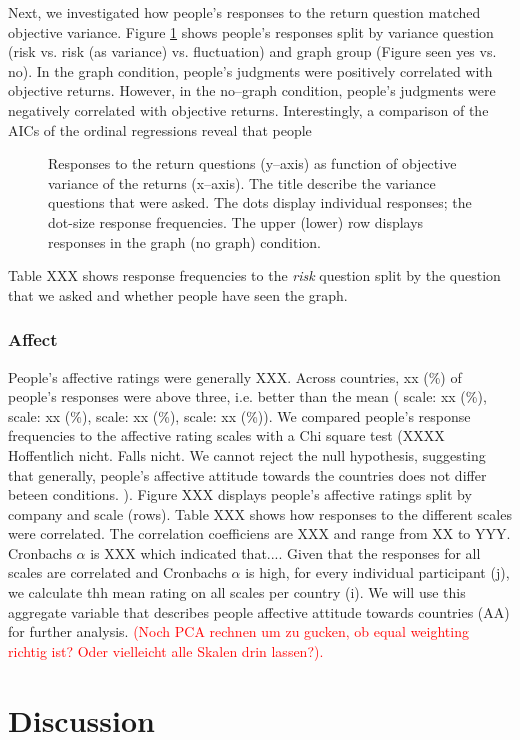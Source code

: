 \documentclass[a4paper,doc, natbib]{apa6} %
\begin{document}
Next, we investigated how people's responses to the return question matched objective variance. Figure \ref{fig:retsvoS2} shows people's responses split by variance question (risk vs. risk (as variance) vs. fluctuation) and graph group (Figure seen yes vs. no). In the graph condition, people's judgments were positively correlated with objective returns. However, in the no--graph condition, people's judgments were negatively correlated with objective returns. Interestingly, a comparison of the AICs of the ordinal regressions reveal that people




\begin{figure}[!htbp] 
  \centering
  \caption{Responses to the return questions (y--axis) as function of objective variance of the returns (x--axis). The title describe the variance questions that were asked. The dots display individual responses; the dot-size response frequencies. The upper (lower) row displays responses in the graph (no graph) condition. }
  \label{fig:retsvoS2}
\end{figure}


Table XXX shows response frequencies to the \textit{risk} question split by the question that we asked and whether people have seen the graph. 



\subsubsection{Affect}
People's affective ratings were generally XXX. Across countries, xx (\%) of people's responses were above three, i.e. better than the mean ( scale: xx (\%),  scale: xx (\%),  scale: xx (\%),  scale: xx (\%)). We compared people's response frequencies to the affective rating scales with a Chi square test (XXXX Hoffentlich nicht. Falls nicht. We cannot reject the null hypothesis, suggesting that generally, people's affective attitude towards the countries does not differ beteen conditions. ).
Figure XXX displays people's affective ratings split by company and scale (rows). Table XXX shows how responses to the different scales were correlated. The correlation coefficiens are XXX and range from XX to YYY. Cronbachs $\alpha$ is XXX which indicated that.... Given that the responses for all scales are correlated and Cronbachs $\alpha$ is high, for every individual participant (j), we calculate thh mean rating on all scales per country (i). We will use this aggregate variable that describes people affective attitude towards countries (AA) for further analysis. \textcolor{red}{(Noch PCA rechnen um zu gucken, ob equal weighting richtig ist? Oder vielleicht alle Skalen drin lassen?).}


\section{Discussion}


\end{document}
